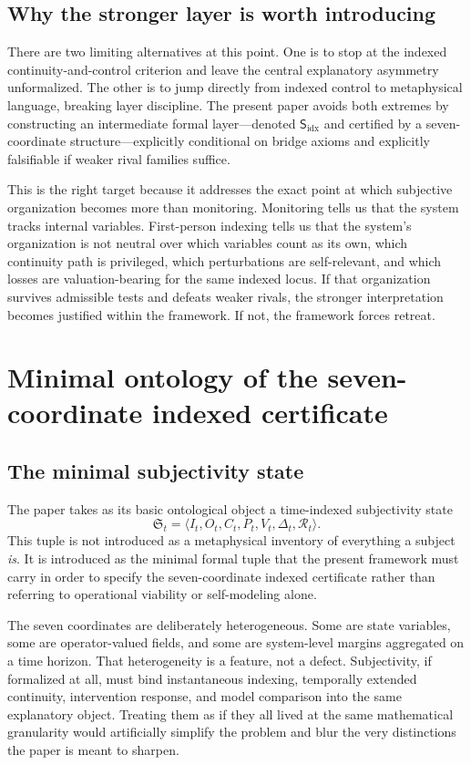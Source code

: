 \documentclass[11pt,a4paper]{article}
\theoremstyle{definition}
\newcommand{\Subfp}{\mathsf{S}_{\mathrm{idx}}}
\newcommand{\Substate}{\mathfrak{S}}
\newcommand{\SelfIndex}{I}
\newcommand{\OwnField}{O}
\newcommand{\ContField}{C}
\newcommand{\Persp}{P}
\newcommand{\ValAsym}{V}
\newcommand{\IntervProf}{\Delta}
\newcommand{\Irred}{\mathcal{R}}
\begin{document}
\subsection{Why the stronger layer is worth introducing}
There are two limiting alternatives at this point. One is to stop at the indexed continuity-and-control criterion and leave the central explanatory asymmetry unformalized. The other is to jump directly from indexed control to metaphysical language, breaking layer discipline. The present paper avoids both extremes by constructing an intermediate formal layer---denoted $\Subfp$ and certified by a seven-coordinate structure---explicitly conditional on bridge axioms and explicitly falsifiable if weaker rival families suffice.

This is the right target because it addresses the exact point at which subjective organization becomes more than monitoring. Monitoring tells us that the system tracks internal variables. First-person indexing tells us that the system's organization is not neutral over which variables count as its own, which continuity path is privileged, which perturbations are self-relevant, and which losses are valuation-bearing for the same indexed locus. If that organization survives admissible tests and defeats weaker rivals, the stronger interpretation becomes justified within the framework. If not, the framework forces retreat.

\section{Minimal ontology of the seven-coordinate indexed certificate}
\subsection{The minimal subjectivity state}
The paper takes as its basic ontological object a time-indexed subjectivity state
\[
\Substate_t = \langle \SelfIndex_t,\OwnField_t,\ContField_t,\Persp_t,\ValAsym_t,\IntervProf_t,\Irred_t \rangle.
\]
This tuple is not introduced as a metaphysical inventory of everything a subject \emph{is}. It is introduced as the minimal formal tuple that the present framework must carry in order to specify the seven-coordinate indexed certificate rather than referring to operational viability or self-modeling alone.

The seven coordinates are deliberately heterogeneous. Some are state variables, some are operator-valued fields, and some are system-level margins aggregated on a time horizon. That heterogeneity is a feature, not a defect. Subjectivity, if formalized at all, must bind instantaneous indexing, temporally extended continuity, intervention response, and model comparison into the same explanatory object. Treating them as if they all lived at the same mathematical granularity would artificially simplify the problem and blur the very distinctions the paper is meant to sharpen.
\end{document}
